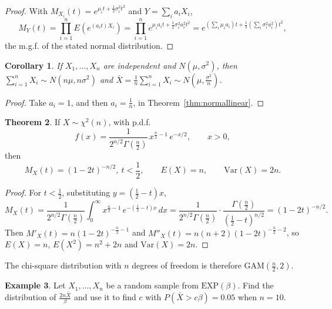\documentclass[12pt,a4paper]{report}
\theoremstyle{definition}
\newtheorem{thm}{Theorem}[section]
\newtheorem{example}[thm]{Example}
\theoremstyle{plain}
\newtheorem{coro}[thm]{Corollary}
\begin{document}
\begin{proof}
With $M_{X_i}(t) = e^{\mu_i t + \frac{1}{2}\sigma^2_it^2}$ and
$Y = \sum_i a_i X_i$,
\[M_Y(t) = \prod^n_{i = 1}E\left(e^{(a_it)X_i}\right) = \prod^n_{i =
1}e^{\mu_ia_it + \frac{1}{2}\sigma^2_ia^2_it^2} = e^{\left(\sum_i\mu_ia_i\right)t +
\frac{1}{2}\left(\sum_i\sigma^2_ia^2_i\right)t^2},\]
the m.g.f. of the stated normal distribution.
\end{proof}

\begin{coro}
\label{cor:samplemean}
If $X_1,\dots,X_n$ are independent and $N(\mu,\sigma^2)$, then
$\sum^n_{i = 1} X_i \sim N(n\mu, n\sigma^2)$ and
$\bar X = \frac{1}{n}\sum^n_{i = 1}X_i \sim N\left(\mu, \frac{\sigma^2}{n}\right)$.
\end{coro}

\begin{proof}
Take $a_i = 1$, and then $a_i = \frac1n$, in Theorem~\ref{thm:normallinear}.
\end{proof}

\begin{thm}
\label{thm:chisquare}
If $X \sim \chi^2(n)$, with p.d.f.
\[f(x) = \frac{1}{2^{n/2}\Gamma\left(\frac{n}{2}\right)}\, x^{\frac{n}{2}-1}\,
e^{-x/2} ,\qquad x > 0 ,\]
then
\[M_X(t) = (1-2t)^{-n/2},\ t<\frac12 ,\qquad E(X) = n ,\qquad \text{Var}(X) =
2n .\]
\end{thm}

\begin{proof}
For $t<\frac12$, substituting $y = \left(\frac{1}{2}-t\right)x$,
\[M_X(t) = \frac{1}{2^{n/2}\Gamma\left(\frac{n}{2}\right)}\int_0^{\infty}x^{\frac{n}
{2}-1}\, e^{-\left(\frac{1}{2}-t\right)x}\, dx = \frac{1}{2^{n/2}\Gamma\left(
\frac{n}{2}\right)}\cdot\frac{\Gamma\left(\frac{n}{2}\right)}{\left(\frac{1}{2}-t
\right)^{n/2}} = (1-2t)^{-n/2} .\]
Then $M'_X(t) = n(1 - 2t)^{-\frac{n}{2}-1}$ and
$M''_X(t) = n(n + 2)(1 - 2t)^{-\frac{n}{2}-2}$, so $E(X) = n$,
$E(X^2) = n^2 + 2n$ and $\text{Var}(X) = 2n$.
\end{proof}

The chi-square distribution with $n$ degrees of freedom is therefore
$\text{GAM}\left(\frac n2,2\right)$.

\begin{example}
\label{ex:mgfsamplemean}
Let $X_1,\dots,X_n$ be a random sample from $\text{EXP}(\beta)$. Find the
distribution of $\frac{2n\bar X}{\beta}$ and use it to find $c$ with
$P(\bar X>c\beta) = 0.05$ when $n = 10$.
\end{example}
\end{document}

